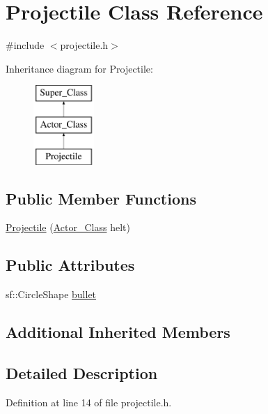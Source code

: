 \hypertarget{class_projectile}{}\section{Projectile Class Reference}
\label{class_projectile}


{\ttfamily \#include $<$projectile.\+h$>$}

Inheritance diagram for Projectile\+:\begin{figure}[H]
\begin{center}
\leavevmode
\includegraphics[height=3.000000cm]{class_projectile}
\end{center}
\end{figure}
\subsection*{Public Member Functions}
\begin{DoxyCompactItemize}
\item 
\hyperlink{class_projectile_a0ca8d850d6bdd8d18dcbc169fc143680}{Projectile} (\hyperlink{class_actor___class}{Actor\+\_\+\+Class} helt)
\end{DoxyCompactItemize}
\subsection*{Public Attributes}
\begin{DoxyCompactItemize}
\item 
sf\+::\+Circle\+Shape \hyperlink{class_projectile_a192f178538dd28037dcae72846693339}{bullet}
\end{DoxyCompactItemize}
\subsection*{Additional Inherited Members}


\subsection{Detailed Description}


Definition at line 14 of file projectile.\+h.



